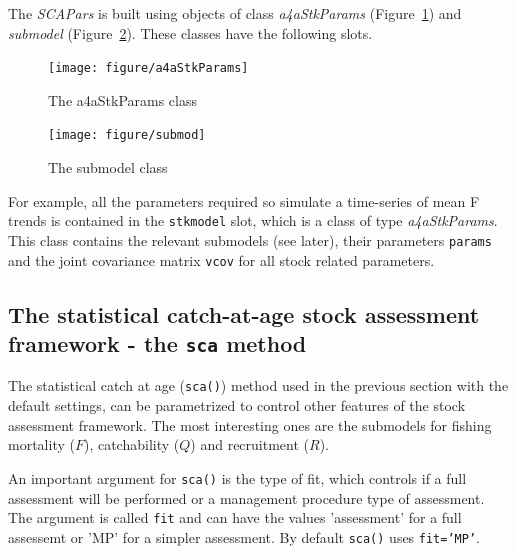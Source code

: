 \documentclass[a4paper,english,10pt]{article}\usepackage[]{graphicx}\usepackage[]{color}
\newenvironment{knitrout}{}{} %
\newcommand{\code}[1]{{\texttt{#1}}}
\newcommand{\class}[1]{{\textit{#1}}}
\begin{document}
The \class{SCAPars} is built using objects of class \class{a4aStkParams} (Figure~\ref{fig:a4aStkParams}) and \class{submodel} (Figure~\ref{fig:submod}). These classes have the following slots.

\begin{knitrout}
\color{fgcolor}\begin{figure}[H]


{\centering \texttt{[image: figure/a4aStkParams]} 

}

\caption[The a4aStkParams class]{The a4aStkParams class\label{fig:a4aStkParams}}
\end{figure}


\end{knitrout}

\begin{knitrout}
\color{fgcolor}\begin{figure}[H]


{\centering \texttt{[image: figure/submod]} 

}

\caption[The submodel class]{The submodel class\label{fig:submod}}
\end{figure}


\end{knitrout}

For example, all the parameters required so simulate a time-series of mean F trends is contained in the \code{stkmodel} slot, which is a class of type \class{a4aStkParams}. This class contains the relevant submodels (see later), their parameters \code{params} and the joint covariance matrix \code{vcov} for all stock related parameters.

\subsection{The statistical catch-at-age stock assessment framework - the \code{sca} method}

The statistical catch at age (\code{sca()}) method used in the previous section with the default settings, can be parametrized to control other features of the stock assessment framework. The most interesting ones are the submodels for fishing mortality ($F$), catchability ($Q$) and recruitment ($R$). 

An important argument for \code{sca()} is the type of fit, which controls if a full assessment will be performed or a management procedure type of assessment. The argument is called \code{fit} and can have the values 'assessment' for a full assessemt or 'MP' for a simpler assessment. By default \code{sca()} uses \code{fit='MP'}. 
\end{document}
